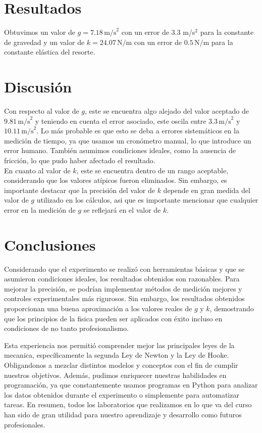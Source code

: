 \documentclass{article}
\begin{document}
\section*{Resultados}
Obtuvimos un valor de $g = 7.18 \, \text{m/s}^2$ con un error de $3.3$ m/s$^2$
para la constante de gravedad y un valor de $k = 24.07 \,
\text{N/m}$ con un error de $0.5 \, \text{N/m}$ para la constante elástica 
del resorte.

\section*{Discusión}
Con respecto al valor de $g$, este se encuentra algo alejado del 
valor aceptado de $9.81 \,\text{m/s}^2$ y teniendo en cuenta el error asociado,
este oscila entre $3.3 \,\text{m/s}^2$ y $10.11 \,\text{m/s}^2$. Lo más probable
es que esto se deba a errores sistemáticos en la medición
de tiempo, ya que usamos un cronómetro manual, lo que introduce un error
humano. También asumimos condiciones ideales, como la ausencia de fricción,
lo que pudo haber afectado el resultado. \\

En cuanto al valor de $k$, este se encuentra dentro de un rango aceptable,
considerando que los valores atípicos fueron eliminados. Sin embargo,
es importante destacar que la precisión del valor de $k$ depende en gran
medida del valor de $g$ utilizado en los cálculos, asi que es importante 
mencionar que cualquier error en la medición de $g$ se reflejará en el valor 
de $k$.
 

\section*{Conclusiones}
Considerando que el experimento se realizó con herramientas básicas y
que se asumieron condiciones ideales, los resultados obtenidos son
razonables. Para mejorar la precisión, se podrían implementar
métodos de medición mejores y controles experimentales más rigurosos.
Sin embargo, los resultados obtenidos proporcionan una buena aproximación
a los valores reales de $g$ y $k$, demostrando que los principios 
de la fisica pueden ser aplicados con éxito incluso en condiciones 
de no tanto profesionalismo.

Esta experiencia nos permitió comprender mejor las principales leyes 
de la mecanica, específicamente la segunda Ley de Newton y la Ley de Hooke.
Obligandonos a mezclar distintos modelos y conceptos con el fin de cumplir
nuestros objetivos.
Además, pudimos enriquecer nuestras habilidades en programación, ya que
constantemente usamos programas en Python para analizar los datos obtenidos
durante el experimento o simplemente para automatizar tareas. En resumen, 
todos los laboratorios que realizamos en lo que va del curso han sido de 
gran utilidad para nuestro aprendizaje y desarrollo como futuros 
profesionales.
\vspace{1.3cm}
\end{document}
